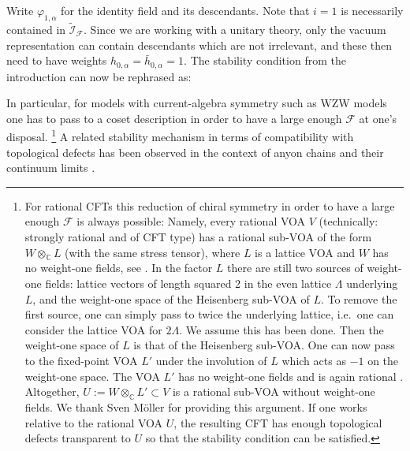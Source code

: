 \documentclass[11pt,a4paper]{article}
\numberwithin{equation}{section}
\begin{document}
Write $\varphi_{1,\alpha}$ for the identity field and its descendants. Note that $i=1$ is necessarily contained in $\widetilde{\mathcal{I}}_{\mathcal{F}}$. Since we are working with a unitary theory, only the vacuum representation can contain descendants which are not irrelevant, and these then need to have weights $h_{0,\alpha} = \bar h_{0,\alpha} = 1$. The stability condition from the introduction can now be rephrased as:
\begin{center}
\end{center}
In particular, for models with current-algebra symmetry such as WZW models one has to pass to a coset description in order to have a large enough $\mathcal{F}$ at one's disposal.
\footnote{
    For rational CFTs this reduction of chiral symmetry in order to have a large enough $\mathcal{F}$ is always possible: 
Namely, every rational VOA $V$ (technically: strongly rational and of CFT type) has a rational sub-VOA of the form $W \otimes_{\mathbb{C}} L$ (with the same stress tensor), where $L$ is a lattice VOA and $W$ has no weight-one fields, see \cite[Prop.\,4.3]{Hohn:2023auw}. 
In the factor $L$ there are still two sources of weight-one fields: lattice vectors of length squared 2 in the even lattice $\Lambda$ underlying $L$, and the weight-one space of the Heisenberg sub-VOA of $L$. 
To remove the first source, one can simply pass to twice the underlying lattice, i.e.\ one can consider the lattice VOA for $2\Lambda$. We assume this has been done. Then the weight-one space of $L$ is that of the Heisenberg sub-VOA.
One can now pass to the fixed-point VOA $L'$ under the involution of $L$ which acts as $-1$ on the weight-one space. The VOA $L'$ has no weight-one fields and is again rational \cite{Miyamoto:2013,Carnahan:2016}. Altogether, $U := W \otimes_{\mathbb{C}} L' \subset V$ is a rational sub-VOA without weight-one fields. We thank Sven Möller for providing this argument.
If one works relative to the rational VOA $U$, the resulting CFT has enough topological defects transparent to $U$ so that the stability condition can be satisfied.
}
A related stability mechanism in terms of compatibility with topological defects has been observed in the context of anyon chains and their continuum limits \cite{PhysRevLett.98.160409,Buican:2017rxc}.
\end{document}
